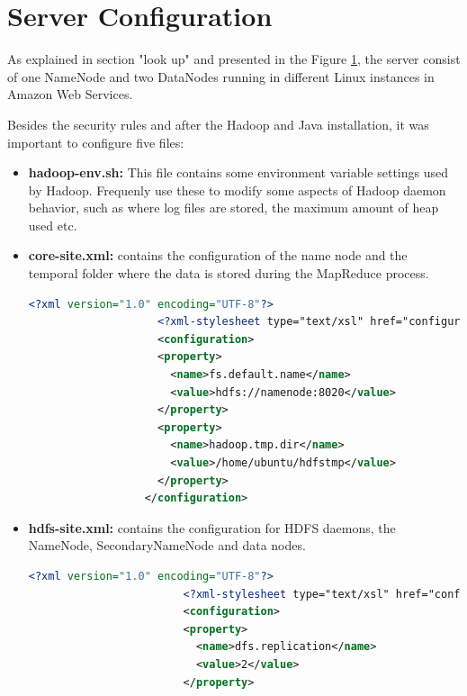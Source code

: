 \documentclass{article}
\begin{document}
        \section{Server Configuration}

        As  explained in section "look up" and presented in the Figure \ref{}, the server consist of one NameNode and two DataNodes running in different Linux instances in Amazon Web Services.

        Besides the security rules and after the Hadoop and Java installation, it was important to configure five files:
            \begin{itemize}
                \item \textbf{hadoop-env.sh:} This file contains some environment variable settings used by Hadoop. Frequenly use these to modify some aspects of Hadoop daemon behavior, such as where log files are stored, the maximum amount of heap used etc.                
                \item \textbf{core-site.xml:} contains the configuration of the name node and the temporal folder where the data is stored during the MapReduce process.
                \begin{lstlisting}[language=XML, caption= core-site.xml, label={lst:core}]
                    <?xml version="1.0" encoding="UTF-8"?>
                    <?xml-stylesheet type="text/xsl" href="configuration.xsl"?>
                    <configuration>
                    <property>
                      <name>fs.default.name</name>
                      <value>hdfs://namenode:8020</value>
                    </property>
                    <property>
                      <name>hadoop.tmp.dir</name>
                      <value>/home/ubuntu/hdfstmp</value>
                    </property>
                  </configuration>
                \end{lstlisting}
                \item \textbf{hdfs-site.xml:} contains the configuration for HDFS daemons, the NameNode, SecondaryNameNode  and data nodes.
                    \begin{lstlisting}[language=XML, caption= hdfs-site.xml, label={lst:hdfs}]
                        <?xml version="1.0" encoding="UTF-8"?>
                        <?xml-stylesheet type="text/xsl" href="configuration.xsl"?>
                        <configuration>
                        <property>
                          <name>dfs.replication</name>
                          <value>2</value>
                        </property>

\end{lstlisting}
\end{itemize}
\end{document}
